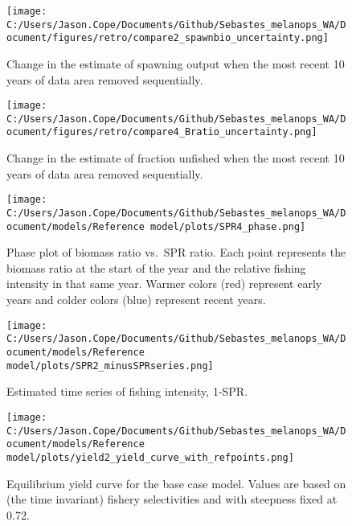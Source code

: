 \documentclass[11pt,
  english,
  letterpaper,
]{article}
\begin{document}
\begin{figure}
\centering
\texttt{[image: C:/Users/Jason.Cope/Documents/Github/Sebastes\_melanops\_WA/Document/figures/retro/compare2\_spawnbio\_uncertainty.png]}
\caption{Change in the estimate of spawning output when the most recent 10 years of data area removed sequentially.\label{fig:retro-ssb}}
\end{figure}

\pagebreak

\begin{figure}
\centering
\texttt{[image: C:/Users/Jason.Cope/Documents/Github/Sebastes\_melanops\_WA/Document/figures/retro/compare4\_Bratio\_uncertainty.png]}
\caption{Change in the estimate of fraction unfished when the most recent 10 years of data area removed sequentially.\label{fig:retro-depl}}
\end{figure}

\newpage

\begin{figure}
\centering
\texttt{[image: C:/Users/Jason.Cope/Documents/Github/Sebastes\_melanops\_WA/Document/models/Reference model/plots/SPR4\_phase.png]}
\caption{Phase plot of biomass ratio vs.~SPR ratio. Each point represents the biomass ratio at the start of the year and the relative fishing intensity in that same year. Warmer colors (red) represent early years and colder colors (blue) represent recent years.\label{fig:phase}}
\end{figure}

\pagebreak

\begin{figure}
\centering
\texttt{[image: C:/Users/Jason.Cope/Documents/Github/Sebastes\_melanops\_WA/Document/models/Reference model/plots/SPR2\_minusSPRseries.png]}
\caption{Estimated time series of fishing intensity, 1-SPR.\label{fig:1-spr}}
\end{figure}

\pagebreak

\begin{figure}
\centering
\texttt{[image: C:/Users/Jason.Cope/Documents/Github/Sebastes\_melanops\_WA/Document/models/Reference model/plots/yield2\_yield\_curve\_with\_refpoints.png]}
\caption{Equilibrium yield curve for the base case model. Values are based on (the time invariant) fishery selectivities and with steepness fixed at 0.72.\label{fig:yield}}
\end{figure}
\end{document}
